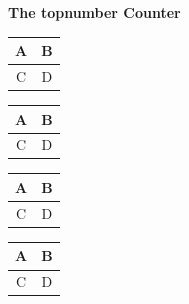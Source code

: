 \documentclass{article}
\begin{document}
	{\centering\Huge\bf The topnumber Counter}
	\vspace{0.5cm}
	\begin{table}[t]
		\begin{tabular}{|c|c|}
			\hline A & B \\ \hline C & D \\ \hline
		\end{tabular}
	\end{table}
	\begin{table}[t]
		\begin{tabular}{|c|c|}
			\hline A & B \\ \hline C & D \\ \hline
		\end{tabular}
	\end{table}
	
	\begin{table}[t]
		\begin{tabular}{|c|c|}
			\hline A & B \\ \hline C & D \\ \hline
		\end{tabular}
	\end{table}
	
	\begin{table}[t]
		\begin{tabular}{|c|c|}
			\hline A & B \\ \hline C & D \\ \hline
		\end{tabular}
	\end{table}
	
	\kant[1]
	
\end{document}
